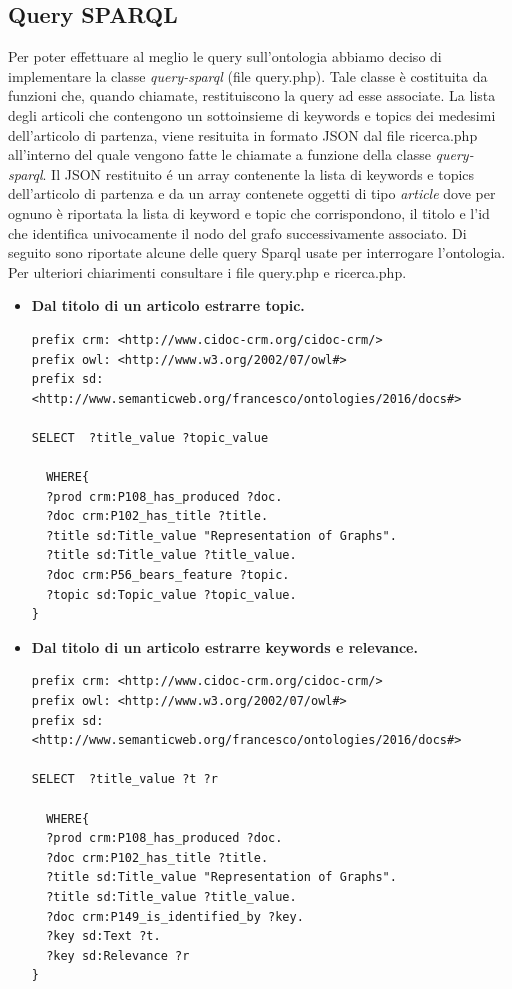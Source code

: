 \documentclass[11pt,a4paper]{article}
\begin{document}
\subsection{Query SPARQL}

Per poter effettuare al meglio le query sull'ontologia abbiamo deciso di implementare la classe \textit{query-sparql} (file query.php). Tale classe è costituita da funzioni che, quando chiamate, restituiscono la query ad esse associate.
\newline \newline
La lista degli articoli che contengono un sottoinsieme di keywords e topics dei medesimi dell'articolo di partenza, viene resituita in formato JSON dal file ricerca.php all'interno del quale vengono fatte le chiamate a funzione della classe \textit{query-sparql}. Il JSON restituito \'e un array contenente la lista di keywords e topics dell'articolo di partenza e da un array contenete oggetti di tipo \textit{article} dove per ognuno è riportata la lista di keyword e topic che corrispondono, il titolo e l'id che identifica univocamente il nodo del grafo successivamente associato.
Di seguito sono riportate alcune delle query  Sparql usate per interrogare l'ontologia. Per ulteriori chiarimenti consultare i file query.php e ricerca.php.

\begin{itemize}
\item \textbf{Dal titolo di un articolo estrarre topic.}
\begin{lstlisting}[breaklines=true]
prefix crm: <http://www.cidoc-crm.org/cidoc-crm/>
prefix owl: <http://www.w3.org/2002/07/owl#>
prefix sd: <http://www.semanticweb.org/francesco/ontologies/2016/docs#>

SELECT  ?title_value ?topic_value
 
  WHERE{
  ?prod crm:P108_has_produced ?doc.
  ?doc crm:P102_has_title ?title.
  ?title sd:Title_value "Representation of Graphs".
  ?title sd:Title_value ?title_value.
  ?doc crm:P56_bears_feature ?topic.
  ?topic sd:Topic_value ?topic_value.
}
\end{lstlisting}
\end{itemize}

\begin{itemize}
\item \textbf{Dal titolo di un articolo estrarre keywords e relevance.}
\begin{lstlisting}[breaklines=true]
prefix crm: <http://www.cidoc-crm.org/cidoc-crm/>
prefix owl: <http://www.w3.org/2002/07/owl#>
prefix sd: <http://www.semanticweb.org/francesco/ontologies/2016/docs#>

SELECT  ?title_value ?t ?r
 
  WHERE{
  ?prod crm:P108_has_produced ?doc.
  ?doc crm:P102_has_title ?title.
  ?title sd:Title_value "Representation of Graphs".
  ?title sd:Title_value ?title_value.
  ?doc crm:P149_is_identified_by ?key.
  ?key sd:Text ?t.
  ?key sd:Relevance ?r
}
\end{lstlisting}
\end{itemize}
\end{document}
